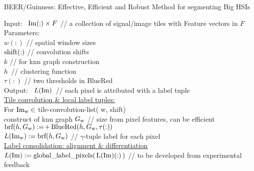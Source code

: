 

\begin{algorithm}[H] 
  \caption{  \footnotesize
    BEER/Guinness: Effective, Efficient and Robust Method for
    segmenting Big HSIs
    \label{alg:ben-tile} }
  \SetAlgoLined
  {Input:\ } ${\rm Im}(:) \times F$ \phantom{space}
  // {\footnotesize a collection of signal/image tiles with Feature vectors in $F$}
  \\
  {\rm Parameters:\ }
  \\
  \phantom{Input:\ } $w(:)$ \phantom{space}
  // {\footnotesize spatial window sizes}
  \\
  \phantom{Input:\ } $ {\rm shift}(:) $ \phantom{space xxx}
  // {\footnotesize convolution shifts}
  \\
  \phantom{Input:\ } $ k $ \phantom{make space xxx}
  // {\footnotesize for knn graph construction}
  \\
  \phantom{Input:\ } $h$\, \phantom{make space xx}
  // {\footnotesize clustering function}
  \\
  \phantom{Input:\ } $ \tau(:) $ \phantom{make space}
  // {\footnotesize two thresholds in BlueRed}
  \\
  {\rm Output:\ } $L(\rm Im)$\, \phantom{space}
  // {\footnotesize each pixel is attributed with a label tuple}
  \\
  \underline{Tile convolution \& local label tuples:}
  \\ 
  For $\mbox{\rm Im}_{\rm w}  \in$ {\rm tile-convolution-list}( w, shift)
  \\
  \phantom{xxx} construct of knn graph $G_{\rm w}$
  \phantom{xxx} // {\footnotesize size from pixel features, can be efficient}  
  \\
  \phantom{xxx}
  $\mbox{\rm brf}(h,G_{\rm w}) :=\!+\! {\  }  \mbox{\rm BlueRed}( h,G_{\rm w},
  \tau(:) )$
  \\
  \phantom{xxx}
  $L({\rm Im}_{\rm w}) := \mbox{\rm brf}(h,G_{\rm w})$
  \phantom{xxx} // {\footnotesize $\gamma$-tuple label for each pixel } 
  \\
  \underline{Label consolidation: alignment \& differentiation}
  \\
  $L(\rm Im) := \mbox{\rm global\_label\_pixels}(\, L({\rm Im})(:)\, ) $ 
  \phantom{xx} // {\footnotesize \* to be developed from experimental feedback} 
  \\
  \phantom{make invisible space}
\end{algorithm}

